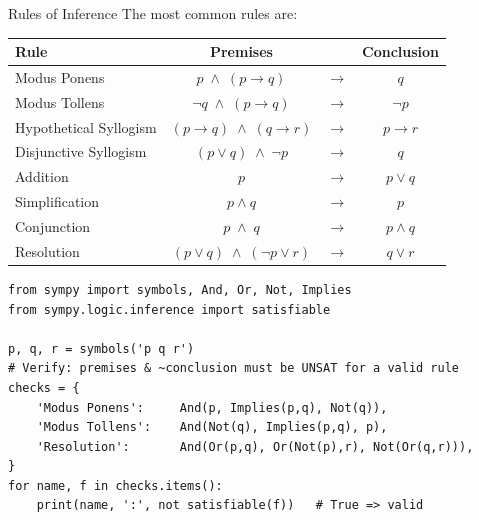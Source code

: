 \documentclass[aspectratio=169]{beamer}
\begin{document}
\begin{frame}[fragile]{Rules of Inference}
  The most common rules are:

  \medskip
  \begin{center}
    \renewcommand{\arraystretch}{1.35}
    \small
    \begin{tabular}{|l|c|c|c|}
      \hline
      \textbf{Rule} & \textbf{Premises} & & \textbf{Conclusion} \\
      \hline
      Modus Ponens           & $p \;\wedge\; (p\to q)$      & $\to$ & $q$       \\
      Modus Tollens          & $\neg q \;\wedge\; (p\to q)$ & $\to$ & $\neg p$  \\
      Hypothetical Syllogism & $(p\to q) \;\wedge\; (q\to r)$& $\to$ & $p\to r$ \\
      Disjunctive Syllogism  & $(p\vee q) \;\wedge\; \neg p$ & $\to$ & $q$      \\
      Addition               & $p$                           & $\to$ & $p\vee q$ \\
      Simplification         & $p\wedge q$                   & $\to$ & $p$       \\
      Conjunction            & $p \;\wedge\; q$              & $\to$ & $p\wedge q$ \\
      Resolution             & $(p\vee q) \;\wedge\; (\neg p\vee r)$ & $\to$ & $q\vee r$ \\
      \hline
    \end{tabular}
  \end{center}

  \medskip
  \begin{lstlisting}[style=python]
from sympy import symbols, And, Or, Not, Implies
from sympy.logic.inference import satisfiable

p, q, r = symbols('p q r')
# Verify: premises & ~conclusion must be UNSAT for a valid rule
checks = {
    'Modus Ponens':     And(p, Implies(p,q), Not(q)),
    'Modus Tollens':    And(Not(q), Implies(p,q), p),
    'Resolution':       And(Or(p,q), Or(Not(p),r), Not(Or(q,r))),
}
for name, f in checks.items():
    print(name, ':', not satisfiable(f))   # True => valid
  \end{lstlisting}
\end{frame}
\end{document}
